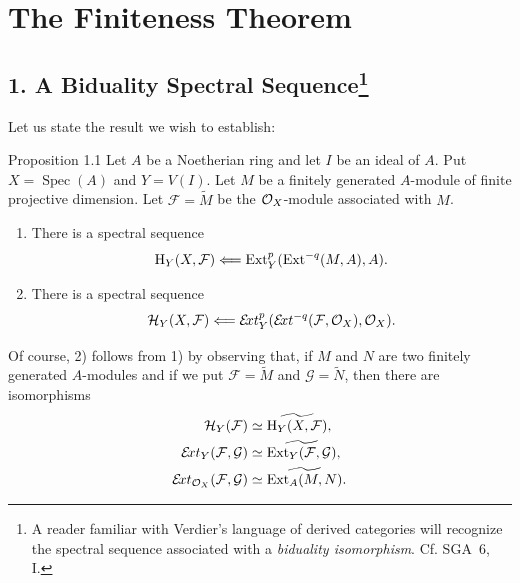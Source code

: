 \makeatletter
\providecommand{\sgareaderlabel}[2]{%
  \begingroup
  \def\@currentlabel{#2}%
  \phantomsection\label{#1}%
  \endgroup}
\makeatother

\chapter{The Finiteness Theorem}
\label{VIII}

\section*{1. A Biduality Spectral Sequence\footnote{A reader familiar with
Verdier's language of derived categories will recognize the spectral sequence
associated with a \emph{biduality isomorphism}. Cf. SGA~6, I.}}
\sgareaderlabel{VIII.1}{1}

Let us state the result we wish to establish:

\begin{sgastatement}{Proposition 1.1}\sgareaderlabel{VIII.1.1}{1.1}
Let $A$ be a Noetherian ring and let $I$ be an ideal of $A$. Put
$X=\operatorname{Spec}(A)$ and $Y=V(I)$. Let $M$ be a finitely generated
$A$-module of finite projective dimension. Let
$\mathcal F=\widetilde M$ be the $\mathcal O_X$-module associated with $M$.
\begin{enumerate}
\item[\textup{1)}] There is a spectral sequence
\[
  \operatorname H_Y(X,\mathcal F)\Longleftarrow
  \operatorname{Ext}_Y^p(\operatorname{Ext}^{-q}(M,A),A).
\]
\item[\textup{2)}] There is a spectral sequence
\[
  \mathcal H_Y(X,\mathcal F)\Longleftarrow
  \mathcal E\!xt_Y^p(\mathcal E\!xt^{-q}(\mathcal F,\mathcal O_X),\mathcal O_X).
\]
\end{enumerate}
\end{sgastatement}


\let\cF\uF

Of course, 2) follows from 1) by observing that, if $M$ and $N$ are two
finitely generated $A$-modules and if we put $\mathcal F=\widetilde M$ and
$\mathcal G=\widetilde N$, then there are isomorphisms
\begin{align*}
  \mathcal H_Y(\mathcal F)
    &\simeq \widetilde{\operatorname H_Y(X,\mathcal F)}, \\
  \mathcal E\!xt_Y(\mathcal F,\mathcal G)
    &\simeq \widetilde{\operatorname{Ext}_Y(\mathcal F,\mathcal G)}, \\
  \mathcal E\!xt_{\mathcal O_X}(\mathcal F,\mathcal G)
    &\simeq \widetilde{\operatorname{Ext}_A(M,N)}.
\end{align*}

